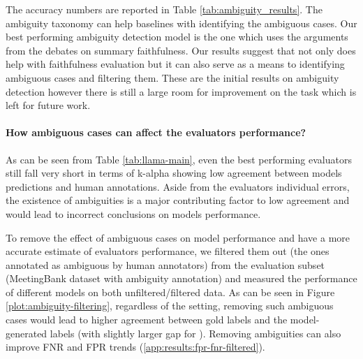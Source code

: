 \noindent 
The accuracy numbers are reported in Table \ref{tab:ambiguity_results}. 
% 
The ambiguity taxonomy can help baselines with identifying the ambiguous cases. Our best performing ambiguity detection model is the one which uses the arguments from the debates on summary faithfulness. %
Our results suggest that not only does \method help with faithfulness evaluation but it can also serve as a means to identifying ambiguous cases and filtering them. 
These are the initial results on ambiguity detection however there is still a large room for improvement on the task which is left for future work.


\paragraph{How ambiguous cases can affect the evaluators performance?}
As can be seen from Table \ref{tab:llama-main}, even the best performing evaluators still fall very short in terms of k-alpha showing low agreement between models predictions and human annotations. Aside from the evaluators individual errors, the existence of ambiguities is a major contributing factor to low agreement and would lead to incorrect conclusions on models performance.


To remove the effect of ambiguous cases on model performance and have a more accurate estimate of evaluators performance, we filtered them out (the ones annotated as ambiguous by human annotators) from the evaluation subset (MeetingBank dataset with ambiguity annotation) and measured the performance of different models on both unfiltered/filtered data. 
As can be seen in Figure \ref{plot:ambiguity-filtering}, regardless of the setting, removing such ambiguous cases would lead to higher agreement between gold labels and the model-generated labels (with slightly larger gap for \method). Removing ambiguities can also improve FNR and FPR trends (\ref{app:results:fpr-fnr-filtered}).


% 


